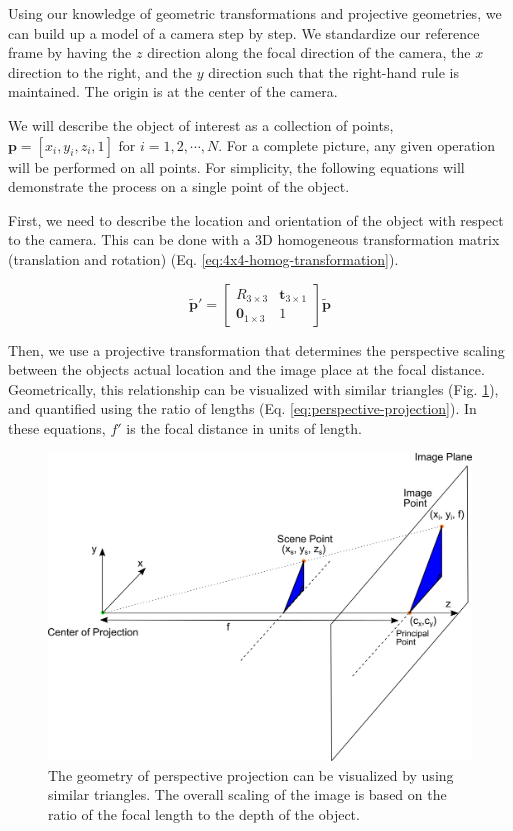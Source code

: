Using our knowledge of geometric transformations and projective geometries, we can build up a model of a camera step by step. We standardize our reference frame by having the $z$ direction along the focal direction of the camera, the $x$ direction to the right, and the $y$ direction such that the right-hand rule is maintained. The origin is at the center of the camera.

We will describe the object of interest as a collection of points, $\mathbf{p} =  [x_i, y_i, z_i, 1] \text{ for } i = 1,2,\cdots,N$. For a complete picture, any given operation will be performed on all points. For simplicity, the following equations will demonstrate the process on a single point of the object.

First, we need to describe the location and orientation of the object with respect to the camera. This can be done with a 3D homogeneous transformation matrix (translation and rotation) (Eq. \ref{eq:4x4-homog-transformation}).

\begin{equation}
    \tilde{\mathbf{p}}' = \begin{bmatrix}
        R_{3 \times 3} & \mathbf{t}_{3 \times 1} \\ \mathbf{0}_{1 \times 3} & 1
    \end{bmatrix} \tilde{\mathbf{p}}
    \label{eq:4x4-homog-transformation}
\end{equation}

Then, we use a projective transformation that determines the perspective scaling between the objects actual location and the image place at the focal distance. Geometrically, this relationship can be visualized with similar triangles (Fig. \ref{fig:perspective-projection}), and quantified using the ratio of lengths (Eq. \ref{eq:perspective-projection}). In these equations, $f'$ is the focal distance in units of length.

\begin{figure}[h!]
    \begin{center}
        \includegraphics[width=0.85\linewidth]{figs/background/png/perspective-projection.png}
    \end{center}
    \caption{The geometry of perspective projection can be visualized by using similar triangles. The overall scaling of the image is based on the ratio of the focal length to the depth of the object.}
    \label{fig:perspective-projection}
\end{figure}



